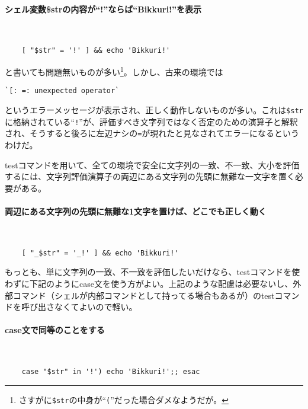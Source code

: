 \paragraph{シェル変数\$strの内容が``!''ならば``Bikkuri!''を表示} 　\\
\begin{frameboxit}{160.0mm}
\begin{verbatim}
	[ "$str" = '!' ] && echo 'Bikkuri!'
\end{verbatim}
\end{frameboxit}

と書いても問題無いものが多い\footnote{さすがに\verb|$str|の中身が``\verb|(|''だった場合ダメなようだが。}。しかし、古来の環境では

\begin{screen}
	\verb|`[: =: unexpected operator`|
\end{screen}

というエラーメッセージが表示され、正しく動作しないものが多い。これは\verb|$str|に格納されている``\verb|!|''が、評価すべき文字列ではなく否定のための演算子と解釈され、そうすると後ろに左辺ナシの\verb|=|が現れたと見なされてエラーになるというわけだ。

testコマンドを用いて、全ての環境で安全に文字列の一致、不一致、大小を評価するには、文字列評価演算子の両辺にある文字列の先頭に無難な一文字を置く必要がある。

\paragraph{両辺にある文字列の先頭に無難な1文字を置けば、どこでも正しく動く} 　\\
\begin{frameboxit}{160.0mm}
\begin{verbatim}
	[ "_$str" = '_!' ] && echo 'Bikkuri!'
\end{verbatim}
\end{frameboxit}

もっとも、単に文字列の一致、不一致を評価したいだけなら、testコマンドを使わずに下記のようにcase文を使う方がよい。上記のような配慮は必要ないし、外部コマンド（シェルが内部コマンドとして持ってる場合もあるが）のtestコマンドを呼び出さなくてよいので軽い。

\paragraph{case文で同等のことをする} 　\\
\begin{frameboxit}{160.0mm}
\begin{verbatim}
	case "$str" in '!') echo 'Bikkuri!';; esac
\end{verbatim}
\end{frameboxit}

